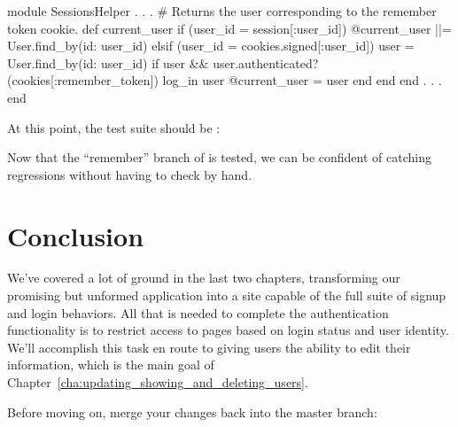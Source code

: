 \begin{codelisting}
\label{code:branch_no_raise}
\begin{code}
module SessionsHelper
  .
  .
  .
  # Returns the user corresponding to the remember token cookie.
  def current_user
    if (user_id = session[:user_id])
      @current_user ||= User.find_by(id: user_id)
    elsif (user_id = cookies.signed[:user_id])
      user = User.find_by(id: user_id)
      if user && user.authenticated?(cookies[:remember_token])
        log_in user
        @current_user = user
      end
    end
  end
  .
  .
  .
end
\end{code}
\end{codelisting}

\noindent At this point, the test suite should be \passing:

\begin{codelisting}
\codecaption{\passing}
\end{codelisting}

\noindent Now that the ``remember'' branch of  is tested, we can be confident of catching regressions without having to check by hand.





  \section{Conclusion} %

We've covered a lot of ground in the last two chapters, transforming our promising but unformed application into a site capable of the full suite of signup and login behaviors. All that is needed to complete the authentication functionality is to restrict access to pages based on login status and user identity. We'll accomplish this task en route to giving users the ability to edit their information, which is the main goal of Chapter~\ref{cha:updating_showing_and_deleting_users}.

Before moving on, merge your changes back into the master branch:

